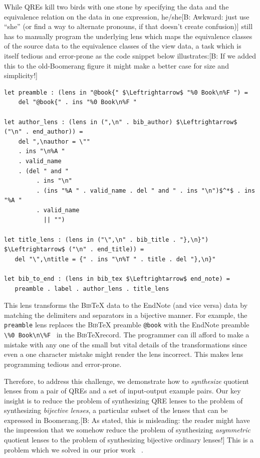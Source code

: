 \documentclass{svproc}
\newcommand{\cd}[1]{\lstinline[backgroundcolor=\color{white}]$#1$}
\newcommand{\FINISH}[3]{\ifdraft\textcolor{#1}{[#2: #3]}\fi}
\newcommand{\bcp}[1]{\FINISH{dkred}{B}{#1}}
\newcommand{\bibtex}{\textsc{Bib}\TeX{}}
\begin{document}
While QREs kill two birds with one stone by specifying the
data and the equivalence relation on the data in one expression,
he/she\bcp{Awkward: just use ``she'' (or find a way to alternate pronouns,
  if that doesn't create confusion)}
still has to manually program the underlying lens which maps the equivalence
classes of the source data to the equivalence classes of the view data, a task
which is itself tedious and error-prone as the code snippet below
illustrates:\bcp{If we added this to the old-Boomerang figure it might make
  a better case for size and simplicity!}

\begin{lstlisting}
let preamble : (lens in "@book{" $\Leftrightarrow$ "%0 Book\n%F ") = 
    del "@book{" . ins "%0 Book\n%F "
  
let author_lens : (lens in (",\n" . bib_author) $\Leftrightarrow$ ("\n" . end_author)) = 
    del ",\nauthor = \""
    . ins "\n%A "
    . valid_name
    . (del " and "
         . ins "\n"
         . (ins "%A " . valid_name . del " and " . ins "\n")$^*$ . ins "%A "
         . valid_name
           || "")
           
let title_lens : (lens in ("\",\n" . bib_title . "},\n}") $\Leftrightarrow$ ("\n" . end_title)) =
   del "\",\ntitle = {" . ins "\n%T " . title . del "},\n}" 
    
let bib_to_end : (lens in bib_tex $\Leftrightarrow$ end_note) =
   preamble . label . author_lens . title_lens
\end{lstlisting}

This lens transforms the \bibtex{} data to the EndNote (and vice versa) data by
matching the delimiters and separators in a bijective manner. For example,
the \cd{preamble} lens replaces the \bibtex{} preamble \cd{@book} with the
EndNote preamble \cd{\%0 Book\n\%F } in the \bibtex{record}. The programmer
can ill afford to make a mistake with any one of the small but vital details
of the transformations since even a one character mistake might render the lens
incorrect. This makes lens programming tedious and error-prone.

Therefore, to address this challenge, we demonstrate how to {\em synthesize}
quotient lenses from a pair of QREs and a set of input-output example pairs.
Our key insight is to reduce the problem of synthesizing QRE lenses to the
problem of synthesizing {\em bijective lenses}, a particular subset of the
lenses that can be expressed in Boomerang.\bcp{As stated, this is
  misleading: the reader might have the impression that we somehow reduce
  the problem of synthesizing {\em asymmetric} quotient lenses to the
  problem of synthesizing bijective ordinary lenses!} This is a problem
which we solved in our prior work ~\cite{popl18}.
\end{document}
